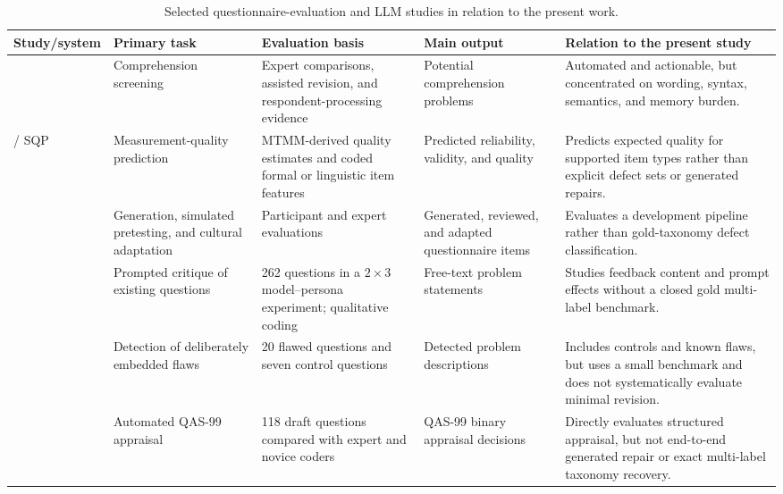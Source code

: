 \documentclass[11pt,a4paper]{article}
\begin{document}
\begin{table}[H]
\centering
\caption{Selected questionnaire-evaluation and LLM studies in relation to the
present work.}
\label{tab:related-work-comparison}
\scriptsize
\renewcommand{\arraystretch}{1.12}
\setlength{\tabcolsep}{3.2pt}
\begin{tabularx}{\textwidth}{
    p{}
    p{}
    p{}
    p{}
    X
}
\toprule
\textbf{Study/system}
& \textbf{Primary task}
& \textbf{Evaluation basis}
& \textbf{Main output}
& \textbf{Relation to the present study} \\
\midrule

\citet{graesser2006quaid}
& Comprehension screening
& Expert comparisons, assisted revision, and respondent-processing evidence
& Potential comprehension problems
& Automated and actionable, but concentrated on wording, syntax, semantics,
  and memory burden. \\

\citet{saris2014design} / SQP
& Measurement-quality prediction
& MTMM-derived quality estimates and coded formal or linguistic item features
& Predicted reliability, validity, and quality
& Predicts expected quality for supported item types rather than explicit
  defect sets or generated repairs. \\

\citet{adhikari2025exploring}
& Generation, simulated pretesting, and cultural adaptation
& Participant and expert evaluations
& Generated, reviewed, and adapted questionnaire items
& Evaluates a development pipeline rather than gold-taxonomy defect
  classification. \\

\citet{metheney2025generative}
& Prompted critique of existing questions
& 262 questions in a $2\times3$ model--persona experiment; qualitative coding
& Free-text problem statements
& Studies feedback content and prompt effects without a closed gold
  multi-label benchmark. \\

\citet{sturgis2026llms}
& Detection of deliberately embedded flaws
& 20 flawed questions and seven control questions
& Detected problem descriptions
& Includes controls and known flaws, but uses a small benchmark and does not
  systematically evaluate minimal revision. \\

\citet{roberts2026survey}
& Automated QAS-99 appraisal
& 118 draft questions compared with expert and novice coders
& QAS-99 binary appraisal decisions
& Directly evaluates structured appraisal, but not end-to-end generated repair
  or exact multi-label taxonomy recovery. \\


\end{tabularx}
\end{table}
\end{document}
